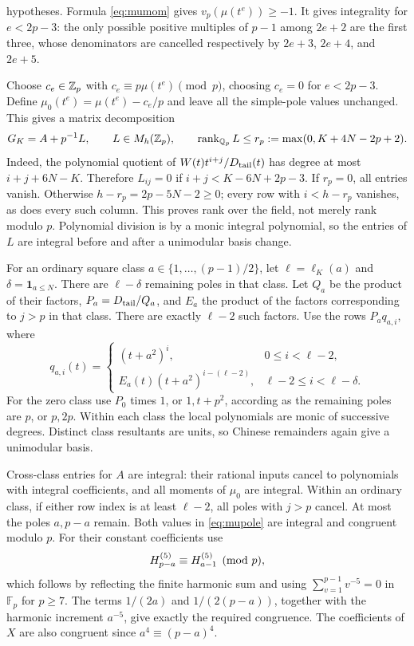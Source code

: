 hypotheses. Formula \eqref{eq:mumom} gives $v_p(\mu(t^e))\ge-1$.
It gives integrality for $e<2p-3$: the only possible positive multiples
of $p-1$ among $2e+2$ are the first three, whose denominators are
cancelled respectively by $2e+3$, $2e+4$, and $2e+5$.

Choose $c_e\in\mathbb Z_p$ with $c_e\equiv p\mu(t^e)\pmod p$, choosing $c_e=0$
for $e<2p-3$. Define $\mu_0(t^e)=\mu(t^e)-c_e/p$ and leave all the
simple-pole values unchanged. This gives a matrix decomposition
\begin{equation}\label{eq:rankdecomp}
 G_K=A+p^{-1}L,\qquad L\in M_h(\mathbb Z_p),\qquad
 \operatorname{rank}_{\mathbb Q_p}L\le r_p:=\max(0,K+4N-2p+2).
\end{equation}
Indeed, the polynomial quotient of $W(t)t^{i+j}/D_{\mathrm{tail}}(t)$ has degree
at most $i+j+6N-K$. Therefore $L_{ij}=0$ if
$i+j<K-6N+2p-3$. If $r_p=0$, all entries vanish. Otherwise
$h-r_p=2p-5N-2\ge0$; every row with $i<h-r_p$ vanishes, as does every
such column. This proves rank over the field, not merely rank modulo $p$.
Polynomial division is by a monic integral polynomial, so the entries of
$L$ are integral before and after a unimodular basis change.

For an ordinary square class $a\in\{1,\ldots,(p-1)/2\}$, let
$\ell=\ell_K(a)$ and $\delta=\boldsymbol1_{a\le N}$. There are
$\ell-\delta$ remaining poles in that class. Let $Q_a$ be the product of
their factors, $P_a=D_{\mathrm{tail}}/Q_a$, and $E_a$ the product of the factors
corresponding to $j>p$ in that class. There are exactly $\ell-2$ such
factors. Use the rows $P_aq_{a,i}$, where
\begin{equation}\label{eq:outerbasis}
 q_{a,i}(t)=
 \begin{cases}
 (t+a^2)^i,&0\le i<\ell-2,\\
 E_a(t)(t+a^2)^{i-(\ell-2)},&\ell-2\le i<\ell-\delta.
 \end{cases}
\end{equation}
For the zero class use $P_0$ times $1$, or $1,t+p^2$, according as the
remaining poles are $p$, or $p,2p$. Within each class the local
polynomials are monic of successive degrees. Distinct class resultants
are units, so Chinese remainders again give a unimodular basis.

Cross-class entries for $A$ are integral: their rational inputs cancel
to polynomials with integral coefficients, and all moments of $\mu_0$
are integral. Within an ordinary class, if either row index is at least
$\ell-2$, all poles with $j>p$ cancel. At most the poles $a,p-a$ remain.
Both values in \eqref{eq:mupole} are integral and congruent modulo $p$.
For their constant coefficients use
\[
 H^{(5)}_{p-a}\equiv H^{(5)}_{a-1}\pmod p,
\]
which follows by reflecting the finite harmonic sum and using
$\sum_{v=1}^{p-1}v^{-5}=0$ in $\mathbb F_p$ for $p\ge7$.
The terms $1/(2a)$ and $1/(2(p-a))$, together with the harmonic increment
$a^{-5}$, give exactly the required congruence. The coefficients of $X$
are also congruent since $a^4\equiv(p-a)^4$.

